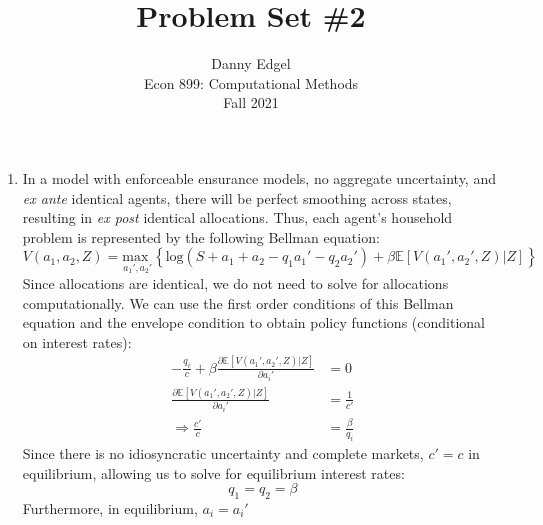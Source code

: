 \documentclass{article}
\newcommand{\loge}[1]{\text{log}\left(#1\right)}
\newcommand{\usmax}[1]{\underset{#1}{\text{max }}}
\newcommand{\E}[1]{\mathbb{E}\left[#1\right]} %
\begin{document}
\title{	Problem Set \#2 }
\author{ 		Danny Edgel 						\\ 
			Econ 899: Computational Methods		\\
			Fall 2021						\\
		}
\maketitle\thispagestyle{empty}



\begin{enumerate}
	\item In a model with enforceable ensurance models, no aggregate uncertainty, and \textit{ex ante} identical agents, there will be perfect smoothing across states, resulting in \textit{ex post} identical allocations. Thus, each agent's household problem is represented by the following Bellman equation:
{\footnotesize
	\[
		V(a_1,a_2,Z) = \usmax{a_1', a_2'}\left\{\loge{S + a_1 + a_2 - q_1a_1'-q_2a_2'} + \beta\E{V(a_1',a_2', Z)|Z}\right\}
	\]
}
	Since allocations are identical, we do not need to solve for allocations computationally. We can use the first order conditions of this Bellman equation and the envelope condition to obtain policy functions (conditional on interest rates):
	\begin{align*}
		-\frac{q_i}{c} + \beta\frac{\partial \E{V(a_1',a_2', Z)|Z}}{\partial a_i'}	&= 0					\\
		\frac{\partial \E{V(a_1',a_2', Z)|Z}}{\partial a_i'}				&= \frac{1}{c'}	\\
		\Rightarrow								 \frac{c'}{c}	&= \frac{\beta}{q_i}
	\end{align*}
	Since there is no idiosyncratic uncertainty and complete markets, ${c'=c}$ in equilibrium, allowing us to solve for equilibrium interest rates: $$ q_1=q_2=\beta $$ Furthermore, in equilibrium, $a_i=a_i'$

	
\end{enumerate}

\end{document}
